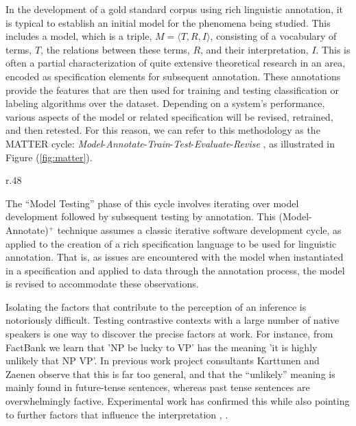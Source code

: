 \documentclass[10pt]{article}
\begin{document}
In the development of a gold standard corpus using rich linguistic annotation, it is typical to establish an initial model for the phenomena being studied. This includes a model, which is a triple, $M = \langle T,R,I \rangle$, consisting of a vocabulary of terms, $T$, the relations between these terms, $R$, and their interpretation,
$I$. This is often a partial characterization of quite extensive theoretical research in an area, encoded as specification elements for subsequent annotation. These annotations provide the features that are then used for training and testing classification or labeling algorithms over the dataset. Depending on a system's performance, various aspects of the model or related specification will be revised, retrained, and then retested. 
For this reason, we can refer to this methodology as the MATTER cycle: {\it Model}-{\it Annotate}-{\it Train}-{\it Test}-{\it Evaluate}-{\it Revise} \cite{pustejovsky2012natural}, as illustrated in Figure (\ref{fig:matter}). 

\begin{wrapfigure}{r}{.48\textwidth}
\vspace {-9mm}

\centering
{}
\vspace {-4mm}
\caption{The \textsc{matter} Methodology}
\label{fig:matter}

\vspace {-2mm}

\end{wrapfigure}

The ``Model Testing'' phase of this cycle involves iterating over model development followed by subsequent testing by annotation. This (Model-Annotate)$^+$ technique assumes a classic iterative software development cycle, as applied to the creation of a rich specification language to be used for linguistic annotation.  That is, as issues are encountered with the model when instantiated in a specification and applied to data through the annotation process, the model is revised to accommodate these observations. 


Isolating the factors that contribute to the perception of an inference is  notoriously difficult. Testing contrastive contexts with a large number of native speakers is one way to discover the precise factors at work.
For instance, from FactBank we learn that 'NP be lucky to VP' has the meaning 'it is highly unlikely that NP VP'. In previous work project consultants Karttunen and Zaenen \cite{karttunen:2012b,zaenen+karttunen:2013} observe that this is far too general, and that the ``unlikely'' meaning is mainly found in future-tense sentences, whereas past tense sentences are overwhelmingly factive. Experimental work has confirmed this while also pointing to further factors that influence the interpretation \cite{csli-gang-cil13}, \cite{karttunen2014}.
\end{document}
